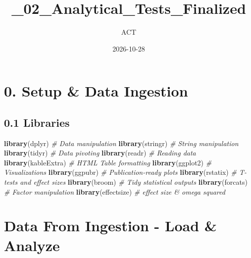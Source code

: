 \documentclass[
]{article}
\title{\_02\_Analytical\_Tests\_Finalized}
\author{ACT}
\date{2026-10-28}
\newenvironment{Shaded}{\begin{snugshade}}{\end{snugshade}}
\newcommand{\CommentTok}[1]{\textcolor[rgb]{0.56,0.35,0.01}{\textit{#1}}}
\newcommand{\FunctionTok}[1]{\textcolor[rgb]{0.13,0.29,0.53}{\textbf{#1}}}
\newcommand{\NormalTok}[1]{#1}
\begin{document}
\maketitle

\section{0. Setup \& Data Ingestion}\label{setup-data-ingestion}

\subsection{0.1 Libraries}\label{libraries}

\begin{Shaded}
\begin{Highlighting}[]
\FunctionTok{library}\NormalTok{(dplyr)       }\CommentTok{\# Data manipulation}
\FunctionTok{library}\NormalTok{(stringr)     }\CommentTok{\# String manipulation}
\FunctionTok{library}\NormalTok{(tidyr)       }\CommentTok{\# Data pivoting}
\FunctionTok{library}\NormalTok{(readr)       }\CommentTok{\# Reading data}
\FunctionTok{library}\NormalTok{(kableExtra)  }\CommentTok{\# HTML Table formatting}
\FunctionTok{library}\NormalTok{(ggplot2)     }\CommentTok{\# Visualizations}
\FunctionTok{library}\NormalTok{(ggpubr)      }\CommentTok{\# Publication{-}ready plots}
\FunctionTok{library}\NormalTok{(rstatix)     }\CommentTok{\# T{-}tests and effect sizes}
\FunctionTok{library}\NormalTok{(broom)       }\CommentTok{\# Tidy statistical outputs}
\FunctionTok{library}\NormalTok{(forcats)     }\CommentTok{\# Factor manipulation}
\FunctionTok{library}\NormalTok{(effectsize)  }\CommentTok{\# effect size \& omega squared}
\end{Highlighting}
\end{Shaded}

\section{Data From Ingestion - Load \&
Analyze}\label{data-from-ingestion---load-analyze}
\end{document}
